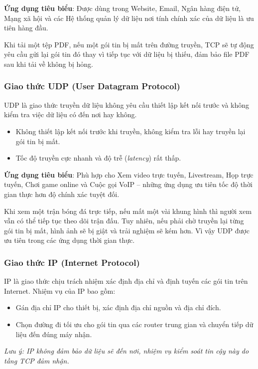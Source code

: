 \documentclass[11pt,oneside]{book}
\begin{document}
\textbf{Ứng dụng tiêu biểu}: Được dùng trong Website, Email, Ngân hàng điện tử, Mạng xã hội và các Hệ thống quản lý dữ liệu nơi tính chính xác của dữ liệu là ưu tiên hàng đầu.

\begin{tipBox}
Khi tải một tệp PDF, nếu một gói tin bị mất trên đường truyền, TCP sẽ tự động yêu cầu gửi lại gói tin đó thay vì tiếp tục với dữ liệu bị thiếu, đảm bảo file PDF sau khi tải về không bị hỏng.
\end{tipBox}

\subsubsection{Giao thức UDP (User Datagram Protocol)}

UDP là giao thức truyền dữ liệu không yêu cầu thiết lập kết nối trước và không kiểm tra việc dữ liệu có đến nơi hay không.
\begin{itemize}[leftmargin=1.8em, itemsep=2pt, parsep=0pt]
    \item Không thiết lập kết nối trước khi truyền, không kiểm tra lỗi hay truyền lại gói tin bị mất.
    \item Tốc độ truyền cực nhanh và độ trễ (\textit{latency}) rất thấp.
\end{itemize}

\textbf{Ứng dụng tiêu biểu}: Phù hợp cho Xem video trực tuyến, Livestream, Họp trực tuyến, Chơi game online và Cuộc gọi VoIP -- những ứng dụng ưu tiên tốc độ thời gian thực hơn độ chính xác tuyệt đối.

\begin{tipBox}
Khi xem một trận bóng đá trực tiếp, nếu mất một vài khung hình thì người xem vẫn có thể tiếp tục theo dõi trận đấu. Tuy nhiên, nếu phải chờ truyền lại từng gói tin bị mất, hình ảnh sẽ bị giật và trải nghiệm sẽ kém hơn. Vì vậy UDP được ưu tiên trong các ứng dụng thời gian thực.
\end{tipBox}

\subsubsection{Giao thức IP (Internet Protocol)}

IP là giao thức chịu trách nhiệm xác định địa chỉ và định tuyến các gói tin trên Internet. Nhiệm vụ của IP bao gồm:
\begin{itemize}[leftmargin=1.8em, itemsep=2pt, parsep=0pt]
    \item Gán địa chỉ IP cho thiết bị, xác định địa chỉ nguồn và địa chỉ đích.
    \item Chọn đường đi tối ưu cho gói tin qua các router trung gian và chuyển tiếp dữ liệu đến đúng máy nhận.
\end{itemize}
\textit{Lưu ý: IP không đảm bảo dữ liệu sẽ đến nơi, nhiệm vụ kiểm soát tin cậy này do tầng TCP đảm nhận.}
\end{document}
